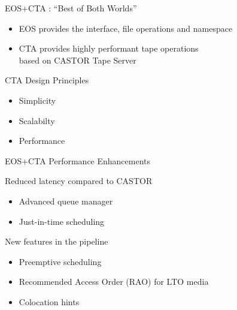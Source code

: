 \documentclass[aspectratio=1610]{beamer}
\begin{document}
\begin{frame}{EOS+CTA : ``Best of Both Worlds''}
   \begin{itemize}
       \item EOS provides the interface, file operations and namespace
       \item CTA provides highly performant tape operations\\
          based on CASTOR Tape Server\\[2ex]
   \end{itemize}
   {\LARGE\color{cern@blue}CTA Design Principles}
   \begin{itemize}
      \item Simplicity
      \item Scalabilty
      \item Performance
   \end{itemize}
\end{frame}

\begin{frame}{EOS+CTA Performance Enhancements}{}

   {\color{cern@blue}Reduced latency compared to CASTOR}
\begin{itemize}
   \item Advanced queue manager\\
   \item Just-in-time scheduling\\[2ex]
\end{itemize}
   {\color{cern@blue}New features in the pipeline}
\begin{itemize}
   \item Preemptive scheduling
   \item Recommended Access Order (RAO) for LTO media
   \item Colocation hints
\end{itemize}
\end{frame}
\end{document}
